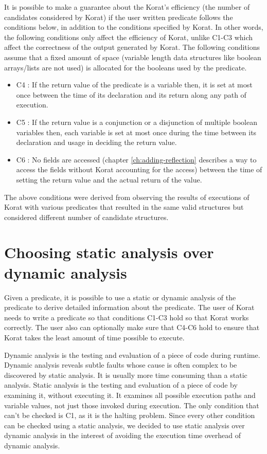 \para
It is possible to make a guarantee about the Korat’s efficiency (the number of candidates considered by Korat) if the user written predicate follows the conditions below, in addition to the conditions specified by Korat. In other words, the following conditions only affect the efficiency of Korat, unlike C1-C3 which affect the correctness of the output generated by Korat. The following conditions assume that a fixed amount of space (variable length data structures like boolean arrays/lists are not used) is allocated for the booleans used by the predicate. 
\begin{itemize}
\item C4 : If the return value of the predicate is a variable then, it is set at most once between the time of its declaration and its return along any path of execution.
\item C5 : If the return value is a conjunction or a disjunction of multiple boolean variables then, each variable is set at most once during the time between its declaration and usage in deciding the return value.
\item C6 : No fields are accessed (chapter \ref{ch:adding-reflection} describes a way to access the fields without Korat accounting for the access) between the time of setting the return value and the actual return of the value.
\end{itemize}

\para
The above conditions were derived from observing the results of executions of Korat with various predicates that resulted in the same valid structures but considered different number of candidate structures.

\section{Choosing static analysis over dynamic analysis}
\label{sec:choosing-static-over-dynamic}
Given a predicate, it is possible to use a static or dynamic analysis of the predicate to derive detailed information about the predicate. The user of Korat needs to write a predicate so that conditions C1-C3 hold so that Korat works correctly. The user also can optionally make sure that C4-C6 hold to ensure that Korat takes the least amount of time possible to execute. 

\para
Dynamic analysis is the testing and evaluation of a piece of code during runtime. Dynamic analysis reveals subtle faults whose cause is often complex to be discovered by static analysis. It is usually more time consuming than a static analysis. Static analysis is the testing and evaluation of a piece of code by examining it, without executing it. It examines all possible execution paths and variable values, not just those invoked during execution. The only condition that can’t be checked is C1, as it is the halting problem. Since every other condition can be checked using a static analysis, we decided to use static analysis over dynamic analysis in the interest of avoiding the execution time overhead of dynamic analysis.

